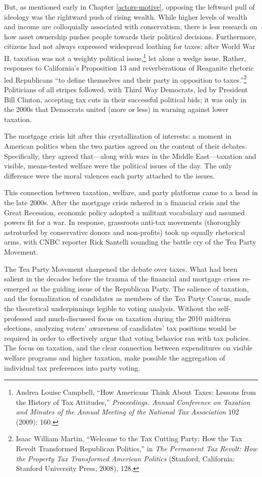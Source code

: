 \documentclass[12pt,oneside]{psthesis}
\begin{document}
But, as mentioned early in Chapter \ref{actors-motive}, opposing the leftward pull of ideology was the rightward push of rising wealth.
While higher levels of wealth and income are colloquially associated with conservatism, there is less research on how asset ownership pushes people towards their political decisions.
Furthermore, citizens had not always expressed widespread loathing for taxes: after World War II, taxation was not a weighty political issue,\footnote{Andrea Louise Campbell, ``How Americans Think About Taxes: Lessons from the History of Tax Attitudes,'' \emph{Proceedings. Annual Conference on Taxation and Minutes of the Annual Meeting of the National Tax Association} 102 (2009): 160.} let alone a wedge issue.
Rather, responses to California's Proposition 13 and reverberations of Reaganite rhetoric led Republicans ``to define themselves and their party in opposition to taxes.''\footnote{Isaac William Martin, ``Welcome to the Tax Cutting Party: How the Tax Revolt Transformed Republican Politics,'' in \emph{The Permanent Tax Revolt: How the Property Tax Transformed American Politics} (Stanford, California: Stanford University Press, 2008), 128.}
Politicians of all stripes followed, with Third Way Democrats, led by President Bill Clinton, accepting tax cuts in their successful political bids; it was only in the 2000s that Democrats united (more or less) in warning against lower taxation.

The mortgage crisis hit after this crystallization of interests: a moment in American politics when the two parties agreed on the content of their debates.
Specifically, they agreed that---along with wars in the Middle East---taxation and visible, means-tested welfare were the political issues of the day.
The only difference were the moral valences each party attached to the issues.

This connection between taxation, welfare, and party platforms came to a head in the late 2000s.
After the mortgage crisis ushered in a financial crisis and the Great Recession, economic policy adopted a militant vocabulary and assumed powers fit for a war.
In response, grassroots anti-tax movements (thoroughly astroturfed by conservative donors and non-profits) took up equally rhetorical arms, with CNBC reporter Rick Santelli sounding the battle cry of the Tea Party Movement.

The Tea Party Movement sharpened the debate over taxes.
What had been salient in the decades before the trauma of the financial and mortgage crises re-emerged as the guiding issue of the Republican Party.
The salience of taxation, and the formalization of candidates as members of the Tea Party Caucus, made the theoretical underpinnings legible to voting analysis.
Without the self-professed and much-discussed focus on taxation during the 2010 midterm elections, analyzing voters' awareness of candidates' tax positions would be required in order to effectively argue that voting behavior ran with tax policies.
The focus on taxation, and the clear connection between expenditures on visible welfare programs and higher taxation, make possible the aggregation of individual tax preferences into party voting.
\end{document}
